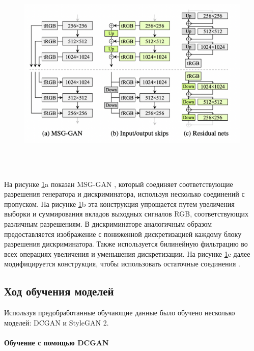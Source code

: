 \begin{figure}
    \centering
    \includegraphics[height=100mm]{fig/stylegan2_generator.png}
    \caption{}
    \label{fig.stylegan2_generator}
\end{figure}

На рисунке {\color{blue} \ref{fig.stylegan2_generator}a} показан MSG-GAN  \cite{MSG_GAN}, который соединяет соответствующие разрешения генератора и дискриминатора, используя несколько соединений с пропуском. На рисунке {\color{blue} \ref{fig.stylegan2_generator}b} эта конструкция упрощается путем увеличения выборки и суммирования вкладов выходных сигналов RGB, соответствующих различным разрешениям. В дискриминаторе аналогичным образом предоставляется изображение с пониженной дискретизацией каждому блоку разрешения дискриминатора. Также используется билинейную фильтрацию во всех операциях увеличения и уменьшения дискретизации. На рисунке {\color{blue} \ref{fig.stylegan2_generator}c} далее модифицируется конструкция, чтобы использовать остаточные соединения \cite{StyleGAN2}.

\subsection{Ход обучения моделей}

Используя предобработанные обучающие данные было обучено несколько моделей: DCGAN и StyleGAN 2.

\paragraph{Обучение с помощью DCGAN}

